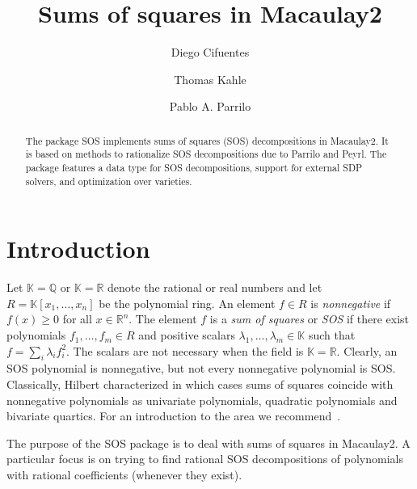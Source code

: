 \documentclass[11pt]{amsart}
\theoremstyle{plain}%
\theoremstyle{definition}
\theoremstyle{remark}
\newcommand{\SOS}{\textsc{SOS}\xspace}
\newcommand{\QQ}{\mathbb{Q}}
\newcommand{\RR}{\mathbb{R}}
\newcommand{\kk}{\mathbb{K}}
\begin{document}
\title[SOS.m2]{Sums of squares in Macaulay2}

\author{Diego Cifuentes}
\address{Massachusetts Institute of Technology \\ Cambridge, MA, USA}

\author{Thomas Kahle}
\address{Otto-von-Guericke University \\ Magdeburg, Germany}

\author{Pablo A. Parrilo}
\address{Massachusetts Institute of Technology \\ Cambridge, MA, USA}


\begin{abstract}
  The package \SOS implements sums of squares (SOS) decompositions in
  Macaulay2.  
  It is based on methods to rationalize SOS decompositions due to Parrilo and Peyrl.
  The package features a data type for SOS decompositions, support for external SDP solvers, and optimization over varieties.
\end{abstract}

\maketitle

\section{Introduction}
\label{s:intro}

Let $\kk = \QQ$ or $\kk = \RR$ denote the rational or real numbers and let $R = \kk[x_{1},\dots,x_{n}]$ be the polynomial ring.  
An element $f\in R$ is \emph{nonnegative} if $f(x) \ge 0$ for all $x \in \RR^{n}$.  
The element $f$ is a \emph{sum of squares} or \emph{SOS} if there exist polynomials $f_{1},\dots,f_{m} \in R$ and positive scalars $\lambda_{1},\dots,\lambda_{m}\in \kk$ such that $f=\sum_{i}\lambda_i f_{i}^{2}$.
The scalars are not necessary when the field is $\kk=\RR$.
Clearly, an SOS polynomial is nonnegative, but not every nonnegative polynomial is SOS.
Classically, Hilbert characterized in which cases sums of squares coincide with nonnegative polynomials as univariate polynomials, quadratic polynomials and bivariate quartics.  
For an introduction to the area we recommend~\cite{scheiderer2009positivity,blekherman2012semidefinite}.

The purpose of the \SOS package is to deal with sums of squares in Macaulay2.
A particular focus is on trying to find rational SOS decompositions of polynomials with rational coefficients (whenever they exist).
\end{document}
